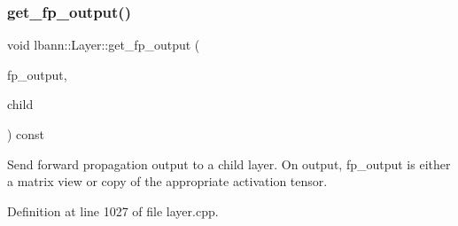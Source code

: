 \subsubsection{\texorpdfstring{get\+\_\+fp\+\_\+output()}{get\_fp\_output()}}
{\footnotesize\ttfamily void lbann\+::\+Layer\+::get\+\_\+fp\+\_\+output (\begin{DoxyParamCaption}\item[{\hyperlink{base_8hpp_a9a697a504ae84010e7439ffec862b470}{Abs\+Dist\+Mat} \&}]{fp\+\_\+output,  }\item[{const \hyperlink{classlbann_1_1Layer}{Layer} $\ast$}]{child }\end{DoxyParamCaption}) const\hspace{0.3cm}{\ttfamily [virtual]}}

Send forward propagation output to a child layer. On output, fp\+\_\+output is either a matrix view or copy of the appropriate activation tensor. 

Definition at line 1027 of file layer.\+cpp.


